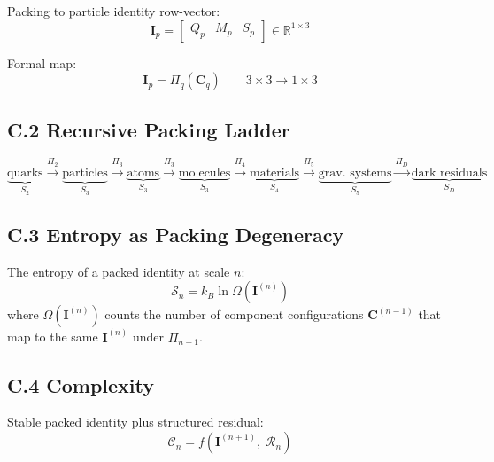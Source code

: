 \documentclass[11pt, a4paper, oneside]{article}
\theoremstyle{definition}
\theoremstyle{plain}
\theoremstyle{remark}
\begin{document}
Packing to particle identity row-vector:
\begin{equation}
  \mathbf{I}_p = \begin{bmatrix} Q_p & M_p & S_p \end{bmatrix}
  \in \mathbb{R}^{1\times 3}
  \tag{C.2}
\end{equation}

Formal map:
\begin{equation}
  \mathbf{I}_p = \Pi_q(\mathbf{C}_q)
  \qquad 3\times 3 \to 1\times 3
  \tag{C.3}
\end{equation}

\subsection*{C.2 Recursive Packing Ladder}

\begin{equation}
  \underbrace{\text{quarks}}_{S_2}
  \xrightarrow{\Pi_2}
  \underbrace{\text{particles}}_{S_3}
  \xrightarrow{\Pi_3}
  \underbrace{\text{atoms}}_{S_3}
  \xrightarrow{\Pi_3}
  \underbrace{\text{molecules}}_{S_3}
  \xrightarrow{\Pi_4}
  \underbrace{\text{materials}}_{S_4}
  \xrightarrow{\Pi_5}
  \underbrace{\text{grav.\ systems}}_{S_5}
  \xrightarrow{\Pi_D}
  \underbrace{\text{dark residuals}}_{S_D}
  \tag{C.4}
\end{equation}

\subsection*{C.3 Entropy as Packing Degeneracy}

The entropy of a packed identity at scale $n$:
\begin{equation}
  \mathcal{S}_n = k_B \ln \Omega(\mathbf{I}^{(n)})
  \tag{C.5}
\end{equation}
where $\Omega(\mathbf{I}^{(n)})$ counts the number of component
configurations $\mathbf{C}^{(n-1)}$ that map to the same
$\mathbf{I}^{(n)}$ under $\Pi_{n-1}$.

\subsection*{C.4 Complexity}

Stable packed identity plus structured residual:
\begin{equation}
  \mathcal{C}_n = f\!\left(\mathbf{I}^{(n+1)},\; \mathcal{R}_n\right)
  \tag{C.6}
\end{equation}
\end{document}
